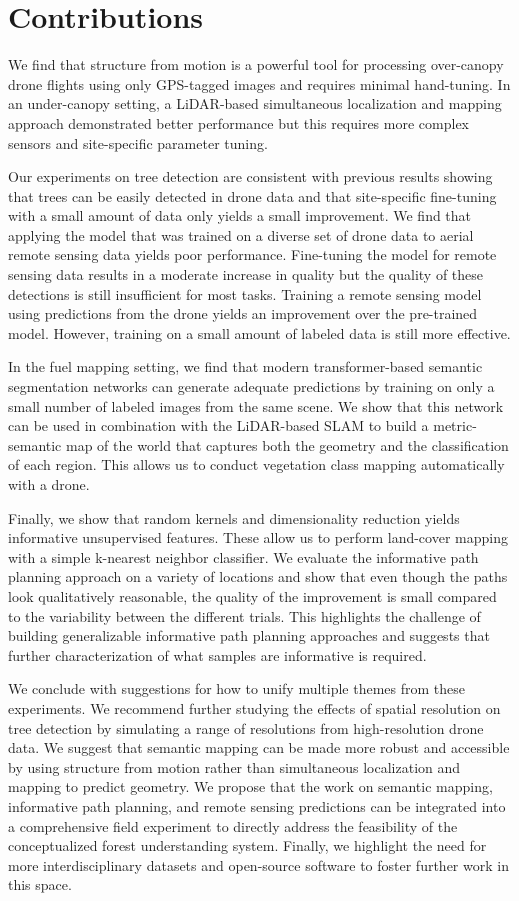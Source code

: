 \section{Contributions}
We find that structure from motion is a powerful tool for processing over-canopy drone flights using only GPS-tagged images and requires minimal hand-tuning. In an under-canopy setting, a LiDAR-based simultaneous localization and mapping approach demonstrated better performance but this requires more complex sensors and site-specific parameter tuning. 

Our experiments on tree detection are consistent with previous results showing that trees can be easily detected in drone data and that site-specific fine-tuning with a small amount of data only yields a small improvement. We find that applying the model that was trained on a diverse set of drone data to aerial remote sensing data yields poor performance. Fine-tuning the model for remote sensing data results in a moderate increase in quality but the quality of these detections is still insufficient for most tasks. Training a remote sensing model using predictions from the drone yields an improvement over the pre-trained model. However, training on a small amount of labeled data is still more effective.

In the fuel mapping setting, we find that modern transformer-based semantic segmentation networks can generate adequate predictions by training on only a small number of labeled images from the same scene. We show that this network can be used in combination with the LiDAR-based SLAM to build a metric-semantic map of the world that captures both the geometry and the classification of each region. This allows us to conduct vegetation class mapping automatically with a drone.

Finally, we show that random kernels and dimensionality reduction yields informative unsupervised features. These allow us to perform land-cover mapping with a simple k-nearest neighbor classifier. We evaluate the informative path planning approach on a variety of locations and show that even though the paths look qualitatively reasonable, the quality of the improvement is small compared to the variability between the different trials. This highlights the challenge of building generalizable informative path planning approaches and suggests that further characterization of what samples are informative is required.


We conclude with suggestions for how to unify multiple themes from these experiments. We recommend further studying the effects of spatial resolution on tree detection by simulating a range of resolutions from high-resolution drone data. We suggest that semantic mapping can be made more robust and accessible by using structure from motion rather than simultaneous localization and mapping to predict geometry. We propose that the work on semantic mapping, informative path planning, and remote sensing predictions can be integrated into a comprehensive field experiment to directly address the feasibility of the conceptualized forest understanding system. Finally, we highlight the need for more interdisciplinary datasets and open-source software to foster further work in this space.